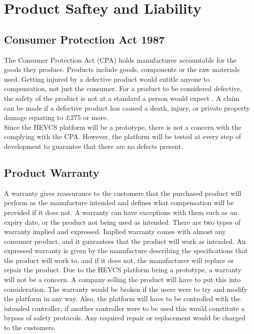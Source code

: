 \documentclass [12pt]{article}
\begin{document}
\section{Product Saftey and Liability}\label{sec:Product_Safety_and_Liability}

\subsection{Consumer Protection Act 1987}\label{sec:Consumer_Protection_Act}

The Consumer Protection Act (CPA) holds manufactures accountable for the goods they produce. Products include goods, components or the raw materials used. Getting injured by a defective product would entitle anyone to compensation, not just the consumer. For a product to be considered defective, the safety of the product is not at a standard a person would expect \cite{Consumer_Protection}. A claim can be made if a defective product has caused a death, injury, or private property damage equating to £275 or more.
\\
Since the HEVCS platform will be a prototype, there is not a concern with the complying with the CPA. However, the platform will be tested at every step of development to guarantee that there are no defects present.

\subsection{Product Warranty}\label{sec:Product_Warranty}

A warranty gives reassurance to the customers that the purchased product will perform as the manufacture intended and defines what compensation will be provided if it does not. \cite{Warranty} A warranty can have exceptions with them such as an expiry date, or the product not being used as intended. There are two types of warranty implied and expressed. Implied warranty comes with almost any consumer product, and it guarantees that the product will work as intended. An expressed warranty is given by the manufacture describing the specifications that the product will work to, and if it does not, the manufacturer will replace or repair the product. \cite{Warranty}
Due to the HEVCS platform being a prototype, a warranty will not be a concern. A company selling the product will have to put this into consideration. The warranty would be broken if the users were to try and modify the platform in any way. Also, the platform will have to be controlled with the intended controller, if another controller were to be used this would constitute a bypass of safety protocols. Any required repair or replacement would be charged to the customers.
\end{document}
